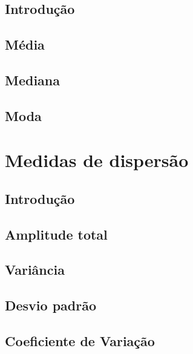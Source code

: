 \documentclass[
]{book}
\begin{document}
\hypertarget{introduuxe7uxe3o-1}{%
\section{Introdução}\label{introduuxe7uxe3o-1}}

\hypertarget{muxe9dia}{%
\section{Média}\label{muxe9dia}}

\hypertarget{mediana}{%
\section{Mediana}\label{mediana}}

\hypertarget{moda}{%
\section{Moda}\label{moda}}

\hypertarget{chap:md}{%
\chapter{Medidas de dispersão}\label{chap:md}}

\hypertarget{introduuxe7uxe3o-2}{%
\section{Introdução}\label{introduuxe7uxe3o-2}}

\hypertarget{amplitude-total}{%
\section{Amplitude total}\label{amplitude-total}}

\hypertarget{variuxe2ncia}{%
\section{Variância}\label{variuxe2ncia}}

\hypertarget{desvio-padruxe3o}{%
\section{Desvio padrão}\label{desvio-padruxe3o}}

\hypertarget{coeficiente-de-variauxe7uxe3o}{%
\section{Coeficiente de Variação}\label{coeficiente-de-variauxe7uxe3o}}
\end{document}
